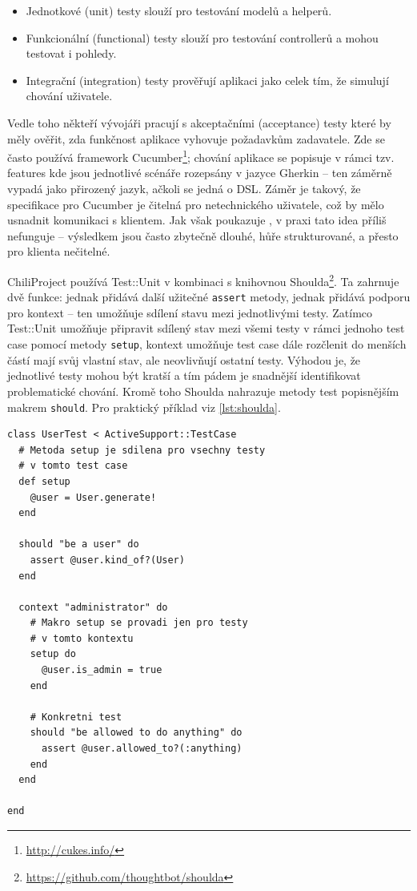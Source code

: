 \documentclass[thesis=B,czech]{FITthesis}[2012/05/02]
\begin{document}
\begin{itemize}
\item
  Jednotkové (unit) testy slouží pro testování modelů a helperů.
\item
  Funkcionální (functional) testy slouží pro testování controllerů a
  mohou testovat i pohledy.
\item
  Integrační (integration) testy prověřují aplikaci jako celek tím, že
  simulují chování uživatele.
\end{itemize}
Vedle toho někteří vývojáři pracují s akceptačními (acceptance) testy
které by měly ověřit, zda funkčnost aplikace vyhovuje požadavkům
zadavatele. Zde se často používá framework Cucumber\footnote{\url{http://cukes.info/}};
chování aplikace se popisuje v rámci tzv. features kde jsou jednotlivé
scénáře rozepsány v jazyce Gherkin -- ten záměrně vypadá jako přirozený
jazyk, ačkoli se jedná o \gls{DSL}. Záměr je takový, že specifikace pro
Cucumber je čitelná pro netechnického uživatele, což by mělo usnadnit
komunikaci s klientem. Jak však poukazuje \citep{Kinsella2011}, v praxi
tato idea příliš nefunguje -- výsledkem jsou často  zbytečně dlouhé, hůře strukturované, a přesto pro
klienta nečitelné.

ChiliProject používá Test::Unit v kombinaci s knihovnou
Shoulda\footnote{\url{https://github.com/thoughtbot/shoulda}}. Ta
zahrnuje dvě funkce: jednak přidává další užitečné \lstinline!assert!
metody, jednak přidává podporu pro kontext -- ten umožňuje sdílení stavu
mezi jednotlivými testy. Zatímco Test::Unit umožňuje připravit sdílený
stav mezi všemi testy v rámci jednoho test case pomocí metody
\lstinline!setup!, kontext umožňuje test case dále rozčlenit do menších
částí mají svůj vlastní stav, ale neovlivňují ostatní testy. Výhodou je,
že jednotlivé testy mohou být kratší a tím pádem je snadnější
identifikovat problematické chování. Kromě toho Shoulda nahrazuje metody
test popisnějším makrem \lstinline!should!. Pro praktický příklad viz \autoref{lst:shoulda}.

\begin{lstlisting}[float,caption={Test case s frameworky Test::Unit a Shoulda},label=lst:shoulda]
class UserTest < ActiveSupport::TestCase
  # Metoda setup je sdilena pro vsechny testy
  # v tomto test case
  def setup
    @user = User.generate!
  end

  should "be a user" do
    assert @user.kind_of?(User)
  end

  context "administrator" do
    # Makro setup se provadi jen pro testy
    # v tomto kontextu
    setup do
      @user.is_admin = true
    end

    # Konkretni test
    should "be allowed to do anything" do
      assert @user.allowed_to?(:anything)
    end
  end

end
\end{lstlisting}
\end{document}
